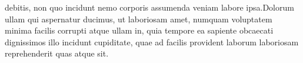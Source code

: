 \documentclass[letterpaper]{article} %
\begin{document}
debitis, non quo incidunt nemo corporis assumenda veniam labore ipsa.Dolorum ullam qui aspernatur ducimus, ut laboriosam amet, numquam voluptatem minima facilis corrupti atque ullam in, quia tempore ea sapiente obcaecati dignissimos illo incidunt cupiditate, quae ad facilis provident laborum laboriosam reprehenderit quas atque sit.\clearpage

\end{document}
